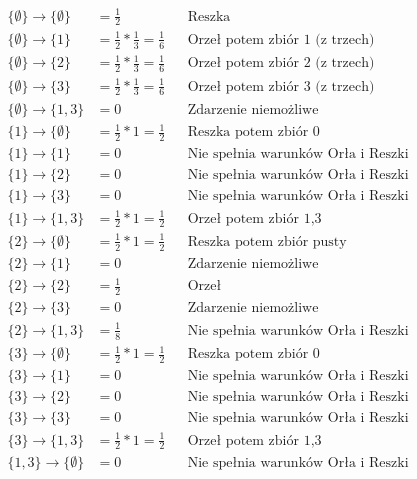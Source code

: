 \begin{enumerate}[label=\alph*)]
\begin{enumerate}
\begin{align*}
\{\emptyset\}\rightarrow \{\emptyset\} &= \frac{1}{2} &&\text{Reszka}\\
\{\emptyset\}\rightarrow \{1\} &= \frac{1}{2}*\frac{1}{3}=\frac{1}{6} &&\text{Orzeł potem zbiór 1 (z trzech)}\\
\{\emptyset\}\rightarrow \{2\} &= \frac{1}{2}*\frac{1}{3}=\frac{1}{6}&&\text{Orzeł potem zbiór 2 (z trzech)}\\
\{\emptyset\}\rightarrow \{3\} &= \frac{1}{2}*\frac{1}{3}=\frac{1}{6}&&\text{Orzeł potem zbiór 3 (z trzech)}\\
\{\emptyset\}\rightarrow \{1,3\} &= 0 &&\text{Zdarzenie niemożliwe}\\
\{1\}\rightarrow \{\emptyset\} &= \frac{1}{2}*1=\frac{1}{2} &&\text{Reszka potem zbiór 0 }\\
\{1\}\rightarrow \{1\} &=0 &&\text{Nie spełnia warunków Orła i Reszki}\\
\{1\}\rightarrow \{2\} &=0 &&\text{Nie spełnia warunków Orła i Reszki}\\
\{1\}\rightarrow \{3\} &=0 &&\text{Nie spełnia warunków Orła i Reszki}\\
\{1\}\rightarrow \{1,3\} &= \frac{1}{2}*1=\frac{1}{2}&&\text{Orzeł potem zbiór 1,3}\\
\{2\}\rightarrow \{\emptyset\} &=\frac{1}{2}*1=\frac{1}{2} &&\text{Reszka potem zbiór pusty}\\
\{2\}\rightarrow \{1\} &=0 &&\text{Zdarzenie niemożliwe}\\
\{2\}\rightarrow \{2\} &=\frac{1}{2} &&\text{Orzeł}\\
\{2\}\rightarrow \{3\} &=0 &&\text{Zdarzenie niemożliwe}\\
\{2\}\rightarrow \{1,3\} &=\frac{1}{8} &&\text{Nie spełnia warunków Orła i Reszki}\\
\{3\}\rightarrow \{\emptyset\} &=\frac{1}{2}*1=\frac{1}{2} &&\text{Reszka potem zbiór 0}\\
\{3\}\rightarrow \{1\} &=0 &&\text{Nie spełnia warunków Orła i Reszki}\\
\{3\}\rightarrow \{2\} &=0 &&\text{Nie spełnia warunków Orła i Reszki}\\
\{3\}\rightarrow \{3\} &=0 &&\text{Nie spełnia warunków Orła i Reszki}\\
\{3\}\rightarrow \{1,3\} &=\frac{1}{2}*1=\frac{1}{2} &&\text{Orzeł potem zbiór 1,3}\\
\{1,3\}\rightarrow \{\emptyset\} &=0 &&\text{Nie spełnia warunków Orła i Reszki}\\

\end{align*}
\end{enumerate}
\end{enumerate}
